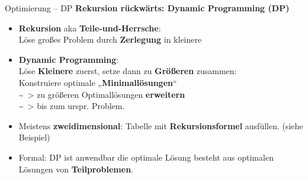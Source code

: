\begin{frame}{Optimierung – DP}
	\textbf{Rekursion rückwärts: Dynamic Programming (DP)} 
	\begin{itemize}
		\item \textbf{Rekursion} aka \textbf{Teile-und-Herrsche}: \\
		Löse großes Problem durch \textbf{Zerlegung} in kleinere
		\pause
		\item \textbf{Dynamic Programming}: \\
		Löse \textbf{Kleinere} zuerst, setze dann zu \textbf{Größeren} zusammen: \\
		\pause
		\quad \hphantom{\~~>} Konstruiere optimale „\textbf{Minimallösungen}“ \\ \quad \~~> zu größeren Optimallösungen \textbf{erweitern} \\ \quad \~~> bis zum urspr. Problem.
		\pause
		\item Meistens \textbf{zweidimensional}: Tabelle mit \textbf{Rekursionsformel} ausfüllen. (siehe Beispiel)
		\pause
		\item Formal: DP ist anwendbar \gdw die optimale Lösung besteht aus optimalen Lösungen von \textbf{Teilproblemen}.
	\end{itemize}
\end{frame}

